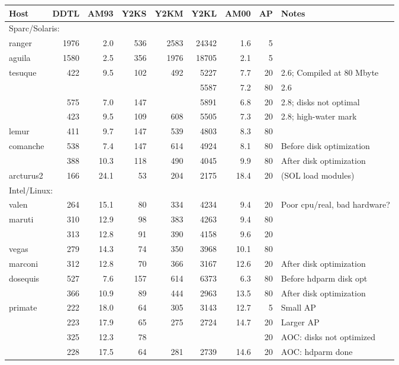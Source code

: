 \documentclass[twoside]{article}
\begin{document}
\begin{table}
\protect\begin{center}
\protect\begin{tabular}{|l|rr|rrrr|rl|} \hline
 Host    &DDTL&AM93&Y2KS&Y2KM&Y2KL&AM00&AP&Notes \\
\hline
\multicolumn{9}{|l|}{Sparc/Solaris:}\\
\hline
ranger   &1976& 2.0&536&2583&24342& 1.6&  5& \\
aguila   &1580& 2.5&356&1976&18705& 2.1&  5& \\
tesuque  & 422& 9.5&102& 492& 5227& 7.7& 20&2.6; Compiled at 80 Mbyte\\
         &    &    &   &    & 5587& 7.2& 80&2.6 \\
         & 575& 7.0&147&    & 5891& 6.8& 20&2.8; disks not optimal \\
         & 423& 9.5&109& 608& 5505& 7.3& 20&2.8; high-water mark \\
lemur    & 411& 9.7&147& 539& 4803& 8.3& 80& \\
comanche & 538& 7.4&147& 614& 4924& 8.1& 80&Before disk optimization\\
         & 388&10.3&118& 490& 4045& 9.9& 80&After disk optimization\\
arcturus2& 166&24.1& 53& 204& 2175&18.4& 20&(SOL load modules)\\
\hline
\multicolumn{9}{|l|}{Intel/Linux:}\\
\hline
valen    & 264&15.1& 80& 334& 4234& 9.4& 20&Poor cpu/real, bad hardware?\\
maruti   & 310&12.9& 98& 383& 4263& 9.4& 80& \\
         & 313&12.8& 91& 390& 4158& 9.6& 20& \\
vegas    & 279&14.3& 74& 350& 3968&10.1& 80& \\
marconi  & 312&12.8& 70& 366& 3167&12.6& 20&After disk optimization\\
dosequis & 527& 7.6&157& 614& 6373& 6.3& 80&Before hdparm disk opt\\
         & 366&10.9& 89& 444& 2963&13.5& 80&After disk optimization\\
primate  & 222&18.0& 64& 305& 3143&12.7&  5&Small AP\\
         & 223&17.9& 65& 275& 2724&14.7& 20&Larger AP\\
         & 325&12.3& 78&    &     &    & 20&AOC: disks not optimized \\
         & 228&17.5& 64& 281& 2739&14.6& 20&AOC: hdparm done \\

\end{tabular}
\end{center}
\end{table}
\end{document}
